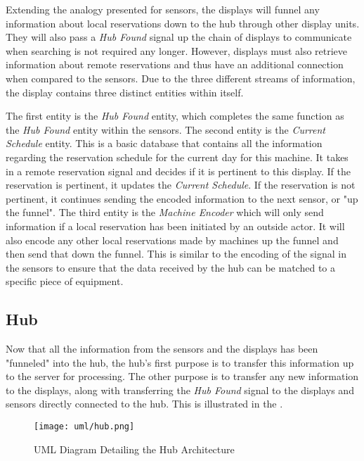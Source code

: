 \documentclass[PPFS.tex]{template/subfiles}
\newcommand{\sn}[1]{\textit{#1}}
\begin{document}
Extending the analogy presented for sensors, the displays will funnel any information about local reservations down to the hub through other display units. They will also pass a \sn{Hub Found} signal up the chain of displays to communicate when searching is not required any longer. However, displays must also retrieve information about remote reservations and thus have an additional connection when compared to the sensors. Due to the three different streams of information, the display contains three distinct entities within itself.

The first entity is the \sn{Hub Found} entity, which completes the same function as the \sn{Hub Found} entity within the sensors. The second entity is the \sn{Current Schedule} entity. This is a basic database that contains all the information regarding the reservation schedule for the current day for this machine. It takes in a remote reservation signal and decides if it is pertinent to this display. If the reservation is pertinent, it updates the \sn{Current Schedule}. If the reservation is not pertinent, it continues sending the encoded information to the next sensor, or "up the funnel". The third entity is the \sn{Machine Encoder} which will only send information if a local reservation has been initiated by an outside actor. It will also encode any other local reservations made by machines up the funnel and then send that down the funnel. This is similar to the encoding of the signal in the sensors to ensure that the data received by the hub can be matched to a specific piece of equipment.

\subsection{Hub}

Now that all the information from the sensors and the displays has been "funneled" into the hub, the hub's first purpose is to transfer this information up to the server for processing. The other purpose is to transfer any new information to the displays, along with transferring the \sn{Hub Found} signal to the displays and sensors directly connected to the hub. This is illustrated in the .

\begin{figure}[H]
    \centering
    \texttt{[image: uml/hub.png]}
    \caption{UML Diagram Detailing the Hub Architecture}
    \label{fig:hub_arch}
\end{figure}
\end{document}
